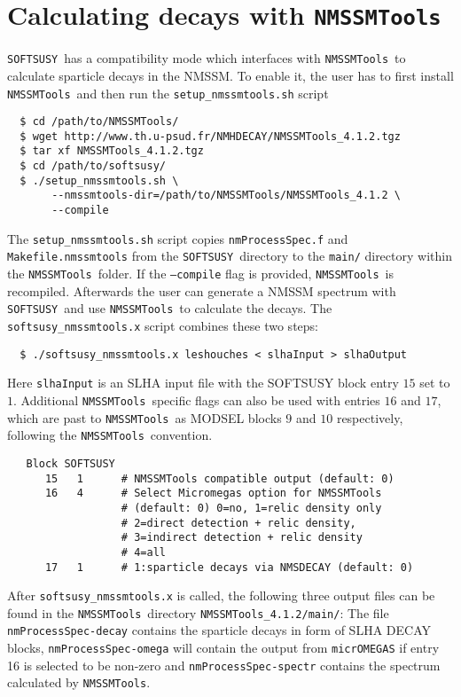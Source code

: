 \documentclass[final,3p,times,pdflatex]{elsarticle}
\def\SOFTSUSY{{\tt SOFTSUSY}}
\def\NMSSMTools{{\tt NMSSMTools}}
\def\code#1{\small{\tt #1}\normalsize}
\begin{document}
\section{Calculating decays with \NMSSMTools\label{sec:decays}}

\SOFTSUSY\ has a compatibility mode which interfaces with \NMSSMTools\
to calculate sparticle decays in the NMSSM.  To enable it, the
user has to first install \NMSSMTools\ and then run the
\code{setup\_nmssmtools.sh} script
%
\begin{verbatim}
  $ cd /path/to/NMSSMTools/
  $ wget http://www.th.u-psud.fr/NMHDECAY/NMSSMTools_4.1.2.tgz
  $ tar xf NMSSMTools_4.1.2.tgz
  $ cd /path/to/softsusy/
  $ ./setup_nmssmtools.sh \
       --nmssmtools-dir=/path/to/NMSSMTools/NMSSMTools_4.1.2 \
       --compile
\end{verbatim}
%
The \code{setup\_nmssmtools.sh} script copies \code{nmProcessSpec.f}
and \code{Makefile.nmssmtools} from the \SOFTSUSY\ directory to the
{\tt main/} directory within the \NMSSMTools\ folder.  If the \code{--compile}
flag is provided, \NMSSMTools\ is recompiled.  Afterwards the user can
generate a NMSSM spectrum with \SOFTSUSY\ and use \NMSSMTools\ to
calculate the decays.  The \code{softsusy\_nmssmtools.x} script combines
these two steps:
%
\begin{verbatim}
  $ ./softsusy_nmssmtools.x leshouches < slhaInput > slhaOutput
\end{verbatim}
%
Here \code{slhaInput} is an SLHA input file with the SOFTSUSY block
entry $15$ set to $1$.  Additional \NMSSMTools\ specific flags can also
be used with entries $16$ and $17$, which are past to \NMSSMTools\ as
MODSEL blocks $9$ and $10$ respectively, following the \NMSSMTools\
convention.
%
\begin{verbatim}
   Block SOFTSUSY
      15   1      # NMSSMTools compatible output (default: 0) 
      16   4      # Select Micromegas option for NMSSMTools
                  # (default: 0) 0=no, 1=relic density only
                  # 2=direct detection + relic density, 
                  # 3=indirect detection + relic density
                  # 4=all  
      17   1      # 1:sparticle decays via NMSDECAY (default: 0)
\end{verbatim}
%
After \code{softsusy\_nmssmtools.x} is called, the following three output
files can be found in the \NMSSMTools\ directory
\code{NMSSMTools\_4.1.2/main/}: The file \code{nmProcessSpec-decay}
contains the sparticle decays in form of SLHA DECAY blocks,
\code{nmProcessSpec-omega} will contain the output from \code{micrOMEGAS} if entry 16 is selected to be non-zero and
\code{nmProcessSpec-spectr} contains the spectrum calculated by
\NMSSMTools.
\end{document}
